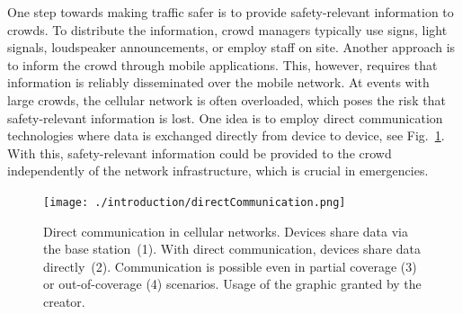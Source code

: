 
One step towards making traffic safer is to provide safety-relevant information to crowds. To distribute the information, crowd managers typically use signs, light signals, loudspeaker announcements, or employ staff on site. Another approach is to inform the crowd through mobile applications. This, however, requires that information is reliably disseminated over the mobile network.
At events with large crowds, the cellular network is often overloaded, which poses the risk that safety-relevant information is lost. One idea is to employ direct communication technologies where data is exchanged directly from device to device, see Fig.~\ref{fig:scenarios}.
With this, safety-relevant information could be provided to the crowd independently of the network infrastructure, which is crucial in emergencies. 


\begin{figure}[hbt!]
\centering
\texttt{[image: ./introduction/directCommunication.png]} 
\caption[Cellular communication]{Direct communication in cellular networks. Devices share data via the base station~(1). With direct communication, devices share data directly~(2). Communication is possible even in partial coverage (3) or out-of-coverage (4) scenarios. Usage of the graphic granted by the creator.}
\label{fig:scenarios}
\end{figure}



